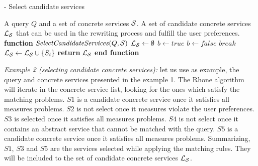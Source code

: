 \begin{algorithm}
\caption{ - Select candidate services}
\label{selectingservices}
\begin{algorithmic}[1]
\REQUIRE A query $Q$ and a set of concrete services $\hbox{${\cal S}$}$.
\ENSURE A set of candidate concrete services $\hbox{${\cal L_{S}}$}$ that can be used in the rewriting process and fulfill the user preferences.
\STATE \textbf{function} $\mathit{SelectCandidateServices} (Q, \hbox{${\cal S}$})$
\STATE $\hbox{${\cal L_{S}}$} \leftarrow \emptyset$
		\STATE $b \leftarrow \mathit{true}$		
				\STATE $b \leftarrow \mathit{false}$	
				\STATE $\mathit{break}$
			\ENDIF
		\ENDFOR
			\STATE $\hbox{${\cal L_{S}}$} \leftarrow \hbox{${\cal L_{S}}$} \cup \lbrace S_{i} \rbrace$	
		\ENDIF
	\ENDIF
\ENDFOR
\STATE \textbf{return} $\hbox{${\cal L_{S}}$}$
\STATE \textbf{end function}
\end{algorithmic}
\end{algorithm}

\bigskip
\noindent \textit{Example 2 (selecting candidate concrete services):} let us use as example, the query and concrete services presented in the example 1. The Rhone algorithm will iterate in the concrete service list,
looking for the ones which satisfy the matching problems. 
$S1$ is a candidate concrete service once it satisfies all measures problems.
$S2$ is not select once it measures violate the user preferences.
$S3$ is selected once it satisfies all measures problems.
$S4$ is not select once it contains an abstract service that cannot be matched with the query.
$S5$ is a candidate concrete service once it satisfies all measures problems. 
Summarizing, $S1$, $S3$ and $S5$ are the services selected while applying the matching rules.  
They will be included to the set of candidate concrete services $\hbox{${\cal L_{S}}$}$. 



